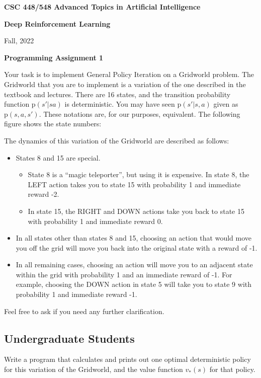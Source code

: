\documentclass{article}
\begin{document}
\centerline{\bf CSC 448/548 Advanced Topics in Artificial Intelligence}
\centerline{\bf Deep Reinforcement Learning}
\centerline{Fall, 2022}
\vspace{\baselineskip}
\centerline{\bf Programming Assignment 1}
\vspace{\baselineskip}

Your task is to implement General Policy Iteration on a Gridworld
problem.  The Gridworld that you are to implement is a variation of
the one described in the textbook and lectures.  There are 16 states,
and the transition probability function $\textrm{p}(s'|sa)$ is
deterministic.  You may  have seen $\textrm{p}(s'|s,a)$ given as
$\textrm{p}(s,a,s')$. These notations are, for our purposes, equivalent. The following figure shows the state numbers:
\begin{center}

\end{center}
The dynamics of this variation of the Gridworld are described as follows:
\begin{itemize}
\item States 8 and 15 are special.
  \begin{itemize}
  \item State 8 is a ``magic teleporter'', but using it is
    expensive. In state 8, the LEFT action takes you to state 15 with
    probability 1 and immediate reward -2.
  \item In state 15, the RIGHT and DOWN actions take you back to state 15 with probability 1 and immediate reward 0.
  \end{itemize}
\item In all states other than states 8 and 15, choosing an action that would move you off the grid will move you back into the original state with a reward of -1.
  \item In all remaining cases, choosing an action will move you to an adjacent
    state within the grid with probability 1 and an immediate reward
    of -1.  For example, choosing the DOWN action in state 5 will take you to state 9 with probability 1 and immediate reward -1. 
\end{itemize}
Feel free to ask if you need any further clarification.

\subsection*{Undergraduate Students}
Write a program that calculates and prints out one optimal deterministic policy for this variation of the Gridworld, and the value function $v_*(s)$ for that policy.
\end{document}
